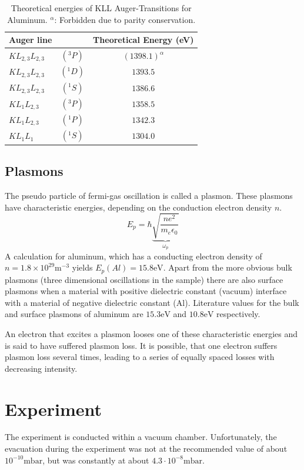 \documentclass[a4paper]{scrartcl}
\numberwithin{equation}{section}
\numberwithin{figure}{section}
\numberwithin{table}{section}
\begin{document}
\begin{table}[!h]
\centering

\begin{tabular}{lcc}
\toprule
Auger line & & Theoretical Energy (eV) \\
\midrule
 $KL_{2,3}L_{2,3}$&$(^3P)$  & $(1398.1)^\alpha$ \\
$ KL_{2,3}L_{2,3}$&$(^1D) $ & $1393.5$ \\
$ KL_{2,3}L_{2,3}$&$(^1S)$ & $1386.6 $ \\
$ KL_{1}L_{2,3}$&$(^3P)$ & $1358.5$ \\
$ KL_{1}L_{2,3}$&$(^1P)$ & $1342.3$ \\
$ KL_{1}L_{1}$&$(^1S)$ & $1304.0$ \\
 \bottomrule

\end{tabular}


\caption{\small Theoretical energies \cite{paper} of KLL Auger-Transitions for Aluminum. $^\alpha$: Forbidden due to parity conservation. }
\label{kll}
\end{table}

\FloatBarrier

\subsection{Plasmons}
\label{sec:plasmonIntro}
The pseudo particle of fermi-gas oscillation is called a plasmon. These plasmons have characteristic energies, depending on the conduction electron density $n$. 
$$E_p = \hbar \underbrace{\sqrt{\frac{ne^2}{m_e \epsilon_0}}}_{\omega_p}$$
A calculation for aluminum, which has a conducting electron density of $n=1.8 \times 10^{29} \text{m}^{-3}$ yields $E_p(Al)=15.8 \text{eV}$.
Apart from the more obvious bulk plasmons (three dimensional oscillations in the sample) there are also surface plasmons when a material with positive dielectric constant (vacuum) interface with a material of negative dielectric constant (Al). Literature values \cite{paperplasmon} for the bulk and surface plasmons of aluminum are $15.3 \text{eV}$ and $10.8 \text{eV}$ respectively.

An electron that excites a plasmon looses one of these characteristic energies and is said to have suffered plasmon loss. It is possible, that one electron suffers plasmon loss several times, leading to a series of equally spaced losses with decreasing intensity.


\section{Experiment}
The experiment is conducted within a vacuum chamber. Unfortunately, the evacuation during the experiment was not at the recommended value of about $10^{-10} \text{mbar}$, but was constantly at about $4.3 \cdot 10^{-8}\text{mbar}$. 
\end{document}
